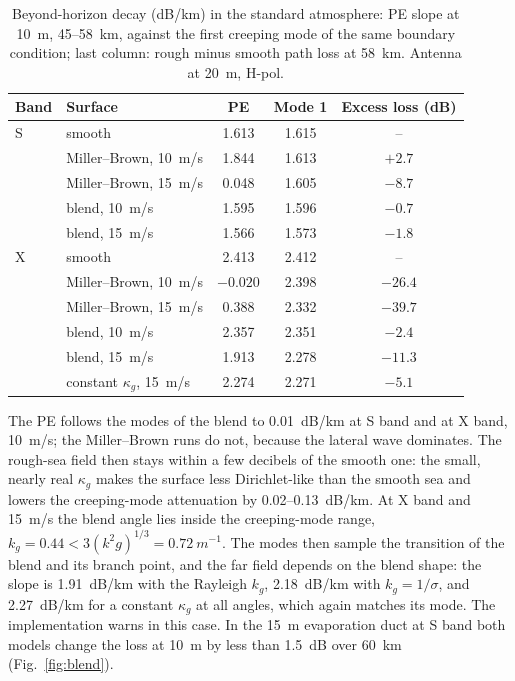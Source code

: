 \documentclass[11pt,a4paper]{article}
\begin{document}
\begin{table}[t]
  \centering
  \caption{Beyond-horizon decay (dB/km) in the standard atmosphere: PE slope at
  \SI{10}{m}, 45--\SI{58}{km}, against the first creeping mode of the same boundary
  condition; last column: rough minus smooth path loss at \SI{58}{km}. Antenna
  at \SI{20}{m}, H-pol.}
  \label{tab:modes}
  \begin{tabular}{llccc}
    \toprule
    Band & Surface & PE & Mode 1 & Excess loss (dB) \\
    \midrule
    S & smooth & 1.613 & 1.615 & -- \\
      & Miller--Brown, \SI{10}{m/s} & 1.844 & 1.613 & $+2.7$ \\
      & Miller--Brown, \SI{15}{m/s} & 0.048 & 1.605 & $-8.7$ \\
      & blend, \SI{10}{m/s} & 1.595 & 1.596 & $-0.7$ \\
      & blend, \SI{15}{m/s} & 1.566 & 1.573 & $-1.8$ \\
    \midrule
    X & smooth & 2.413 & 2.412 & -- \\
      & Miller--Brown, \SI{10}{m/s} & $-0.020$ & 2.398 & $-26.4$ \\
      & Miller--Brown, \SI{15}{m/s} & 0.388 & 2.332 & $-39.7$ \\
      & blend, \SI{10}{m/s} & 2.357 & 2.351 & $-2.4$ \\
      & blend, \SI{15}{m/s} & 1.913 & 2.278 & $-11.3$ \\
      & constant $\kappa_g$, \SI{15}{m/s} & 2.274 & 2.271 & $-5.1$ \\
    \bottomrule
  \end{tabular}
\end{table}

The PE follows the modes of the blend to \SI{0.01}{dB/km} at S band and at X band,
\SI{10}{m/s}; the Miller--Brown runs do not, because the lateral wave dominates. The
rough-sea field then stays within a few decibels of the smooth one: the small,
nearly real $\kappa_g$ makes the surface less Dirichlet-like than the smooth sea and
lowers the creeping-mode attenuation by 0.02--\SI{0.13}{dB/km}. At X band and
\SI{15}{m/s} the blend angle lies inside the creeping-mode range,
$k_g=0.44<3(k^2g)^{1/3}=\SI{0.72}{m^{-1}}$. The modes then sample the transition of
the blend and its branch point, and the far field depends on the blend shape: the
slope is \SI{1.91}{dB/km} with the Rayleigh $k_g$, \SI{2.18}{dB/km} with
$k_g=1/\sigma$, and \SI{2.27}{dB/km} for a constant $\kappa_g$ at all angles, which
again matches its mode. The implementation warns in this case. In the
\SI{15}{m} evaporation duct at S band both models change the loss at \SI{10}{m} by
less than \SI{1.5}{dB} over \SI{60}{km} (Fig.~\ref{fig:blend}).
\end{document}
